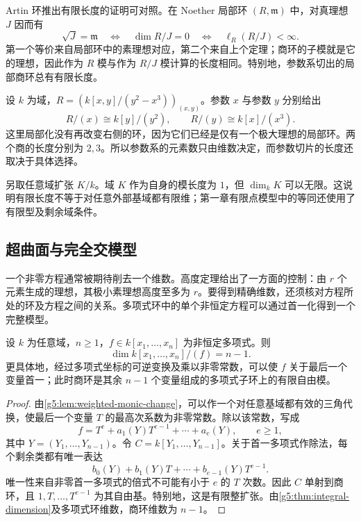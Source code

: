 Artin 环推出有限长度的证明可对照\cite[第3节，定理3.2]{Matsumura1989}。在 Noether 局部环 \((R,\mathfrak m)\) 中，对真理想 \(J\) 因而有
\[
	\sqrt J=\mathfrak m
	\quad\Longleftrightarrow\quad
	\dim R/J=0
	\quad\Longleftrightarrow\quad
	\ell_R(R/J)<\infty.
\]
第一个等价来自局部环中的素理想对应，第二个来自上个定理；商环的子模就是它的理想，因此作为 \(R\) 模与作为 \(R/J\) 模计算的长度相同。特别地，参数系切出的局部商环总有有限长度。

\begin{example}
\label{g5:exm:parameter-lengths}
	设 \(k\) 为域，\(R=(k[x,y]/(y^2-x^3))_{(x,y)}\)。参数 \(x\) 与参数 \(y\) 分别给出
	\[
		R/(x)\cong k[y]/(y^2),\qquad
		R/(y)\cong k[x]/(x^3).
	\]
	这里局部化没有再改变右侧的环，因为它们已经是仅有一个极大理想的局部环。两个商的长度分别为 \(2,3\)。所以参数系的元素数只由维数决定，而参数切片的长度还取决于具体选择。

	另取任意域扩张 \(K/k\)。域 \(K\) 作为自身的模长度为 \(1\)，但 \(\dim_k K\) 可以无限。这说明有限长度不等于对任意外部基域都有限维；第一章有限点模型中的等同还使用了有限型及剩余域条件。
\end{example}

\subsection{超曲面与完全交模型}
\label{g5:subsec:0304:03}

一个非零方程通常被期待削去一个维数。高度定理给出了一方面的控制：由 \(r\) 个元素生成的理想，其极小素理想高度至多为 \(r\)。要得到精确维数，还须核对方程所处的环及方程之间的关系。多项式环中的单个非恒定方程可以通过首一化得到一个完整模型。

\begin{proposition}
\label{g5:prop:polynomial-hypersurface-dimension}
	设 \(k\) 为任意域，\(n\geq1\)，\(f\in k[x_1,\ldots,x_n]\) 为非恒定多项式。则
	\[
		\dim k[x_1,\ldots,x_n]/(f)=n-1.
	\]
	更具体地，经过多项式坐标的可逆变换及乘以非零常数，可以使 \(f\) 关于最后一个变量首一；此时商环是其余 \(n-1\) 个变量组成的多项式子环上的有限自由模。
\end{proposition}
\begin{proof}
	由\cref{g5:lem:weighted-monic-change}，可以作一个对任意基域都有效的三角代换，使最后一个变量 \(T\) 的最高次系数为非零常数。除以该常数，写成
	\[
		f=T^e+a_1(Y)T^{e-1}+\cdots+a_e(Y),
		\qquad e\geq1,
	\]
	其中 \(Y=(Y_1,\ldots,Y_{n-1})\)。令 \(C=k[Y_1,\ldots,Y_{n-1}]\)。关于首一多项式作除法，每个剩余类都有唯一表达
	\[
		b_0(Y)+b_1(Y)T+\cdots+b_{e-1}(Y)T^{e-1}.
	\]
	唯一性来自非零首一多项式的倍式不可能有小于 \(e\) 的 \(T\) 次数。因此 \(C\) 单射到商环，且 \(1,T,\ldots,T^{e-1}\) 为其自由基。特别地，这是有限整扩张。由\cref{g5:thm:integral-dimension}及多项式环维数，商环维数为 \(n-1\)。
\end{proof}


